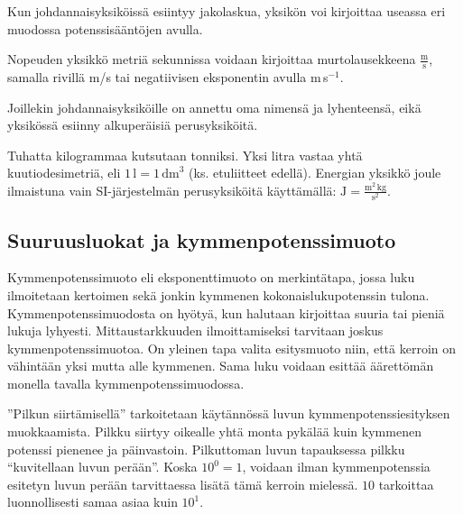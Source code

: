 Kun johdannaisyksiköissä esiintyy jakolaskua, yksikön voi kirjoittaa useassa eri muodossa potenssisääntöjen avulla.

\begin{esimerkki}

Nopeuden yksikkö metriä sekunnissa voidaan kirjoittaa murtolausekkeena $\frac{\text{m}}{\text{s}}$, samalla rivillä m/s tai negatiivisen eksponentin avulla m\,s$^{-1}$.

\end{esimerkki}

Joillekin johdannaisyksiköille on annettu oma nimensä ja lyhenteensä, eikä yksikössä esiinny alkuperäisiä perusyksiköitä. 

\begin{esimerkki}

Tuhatta kilogrammaa kutsutaan tonniksi.
Yksi litra vastaa yhtä kuutiodesimetriä, eli $1\,\text{l}=1\,\text{dm}^3$ (ks. etuliitteet edellä).
Energian yksikkö joule ilmaistuna vain SI-järjestelmän perusyksiköitä käyttämällä: $\text{J}=\frac{\text{m}^2\,\text{kg}}{\text{s}^2}$.

\end{esimerkki}

\subsection*{Suuruusluokat ja kymmenpotenssimuoto}


Kymmenpotenssimuoto eli eksponenttimuoto on merkintätapa, jossa luku ilmoitetaan kertoimen sekä jonkin kymmenen kokonaislukupotenssin tulona. Kymmenpotenssimuodosta on hyötyä, kun halutaan kirjoittaa suuria tai pieniä lukuja lyhyesti. Mittaustarkkuuden ilmoittamiseksi tarvitaan joskus kymmenpotenssimuotoa. On yleinen tapa valita esitysmuoto niin, että kerroin on vähintään yksi mutta alle kymmenen. Sama luku voidaan esittää äärettömän monella tavalla kymmenpotenssimuodossa. 

”Pilkun siirtämisellä” tarkoitetaan käytännössä luvun kymmenpotenssiesityksen muokkaamista. Pilkku siirtyy oikealle yhtä monta pykälää kuin kymmenen potenssi pienenee ja päinvastoin. Pilkuttoman luvun tapauksessa pilkku ``kuvitellaan luvun perään''. Koska $10^0 = 1$, voidaan ilman kymmenpotenssia esitetyn luvun perään tarvittaessa lisätä tämä kerroin mielessä. $10$ tarkoittaa luonnollisesti samaa asiaa kuin $10^1$. 

